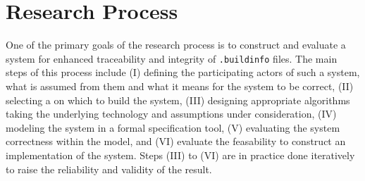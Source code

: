 
\section{Research Process}
\label{sec:researchProcess}






One of the primary goals of the research process is to construct and evaluate a system for enhanced traceability and integrity of \texttt{.buildinfo} files. The main steps of this process include (I) defining the participating actors of such a system, what is assumed from them and what it means for the system to be correct, (II) selecting a  on which to build the system, (III) designing appropriate algorithms taking the underlying technology and assumptions under consideration, (IV) modeling the system in a formal specification tool, (V) evaluating the system correctness within the model, and (VI) evaluate the feasability to construct an implementation of the system. Steps (III) to (VI) are in practice done iteratively to raise the reliability and validity of the result.

